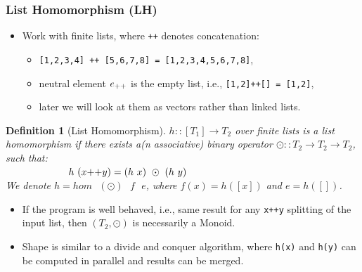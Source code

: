 \documentclass{beamer}
\renewcommand{\emph}[1]{\textcolor{structure}{#1}}
\newcommand{\emp}[1]{\textcolor{DikuRed}{ #1}}
\newtheorem{mydef}{Definition}
\begin{document}
\begin{frame}
  \frametitle{List Homomorphism (LH)}

\begin{itemize}
    \item Work with finite lists, where {\tt ++} denotes concatenation:
        \begin{itemize}
            \item {\tt [1,2,3,4] ++ [5,6,7,8] = [1,2,3,4,5,6,7,8]},
            \item neutral element $e_{\tt++}$ is the empty list, 
                i.e., {\tt [1,2]++[] = [1,2]},
            \item later we will look at them as \emph{vectors} rather 
                    than \alert{linked lists}.
        \end{itemize}
\end{itemize}

\begin{mydef}[List Homomorphism]\label{LHomDef}
$h :: [T_1] \rightarrow T_2$ over finite lists is a {\em list homomorphism}
if there exists a(n associative) binary operator $\odot :: T_2 \rightarrow T_2 \rightarrow T_2$,
such that: \\
$\mbox{ }\mbox{ }\mbox{ }\mbox{ }\mbox{ }\mbox{ }\mbox{ }\mbox{ }\mbox{ }$
\emp{$h \mbox{ } (x{\tt ++}y) = (h\mbox{ }x)\mbox{ }\odot\mbox{ }(h\mbox{ }y)$} \\
We denote $h = hom \mbox{ }(\odot) \mbox{ }f\mbox{ }e$, where $f(x) = h([x])$ 
and $e = h([])$. 
\end{mydef}

\begin{itemize}
    \item If the program is well behaved, i.e., same result
            for any {\tt x++y} splitting of the input list, 
            then $(T_2,\odot)$ is necessarily a Monoid.\smallskip

    \item Shape is similar to a divide and conquer algorithm, where 
            {\tt h(x)} and {\tt h(y)} can be computed in parallel 
            and results can be merged. 
\end{itemize}
\end{frame}
\end{document}
